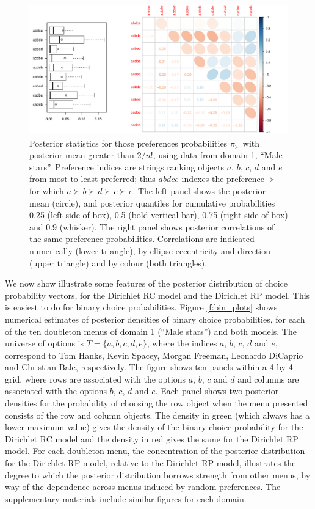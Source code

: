 \documentclass[11pt,letter]{article}
\newcommand{\Dpi}{Dirichlet RP model}
\newcommand{\DP}{Dirichlet RC model}
\begin{document}
\begin{figure}
  \centering
  \includegraphics[width=\textwidth]{figures/pi.pdf}
  \caption{Posterior statistics for those preferences probabilities $\pi_\succ$ with posterior mean greater than $2/n!$, using data from domain 1, ``Male stars''.
  Preference indices are strings ranking objects $a$, $b$, $c$, $d$ and $e$ from most to least preferred; thus $abdce$ indexes the preference $\succ$ for which $a \succ b \succ d \succ c \succ e$.
  The left panel shows the posterior mean (circle), and posterior quantiles for cumulative probabilities 0.25 (left side of box), 0.5 (bold vertical bar), 0.75 (right side of box) and 0.9 (whisker).
  The right panel shows posterior correlations of the same preference probabilities.
  Correlations are indicated numerically (lower triangle), by ellipse eccentricity and direction (upper triangle) and by colour (both triangles).}
  \label{f:pi}
\end{figure}

We now show illustrate some features of the posterior distribution of choice probability vectors, for the \DP{} and the \Dpi{}.
This is easiest to do for binary choice probabilities.
Figure \ref{f:bin_plots} shows numerical estimates of posterior densities of binary choice probabilities, for each of the ten doubleton menus of domain 1 (``Male stars'') and both models.
The universe of options is $T = \{a,b,c,d,e\}$, where the indices $a$, $b$, $c$, $d$ and $e$, correspond to Tom Hanks, Kevin Spacey, Morgan Freeman, Leonardo DiCaprio and Christian Bale, respectively.
The figure shows ten panels within a 4 by 4 grid, where rows are associated with the options $a$, $b$, $c$ and $d$ and columns are associated with the options $b$, $c$, $d$ and $e$.
Each panel shows two posterior densities for the probability of choosing the row object when the menu presented consists of the row and column objects.
The density in green (which always has a lower maximum value) gives the density of the binary choice probability for the \DP{} and the density in red gives the same for the \Dpi{}.
For each doubleton menu, the concentration of the posterior distribution for the \Dpi{}, relative to the \Dpi{}, illustrates the degree to which the posterior distribution borrows strength from other menus, by way of the dependence across menus induced by random preferences.
The supplementary materials include similar figures for each domain.
\end{document}

